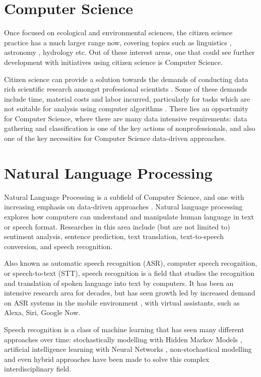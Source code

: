 \section*{Computer Science}

Once focused on ecological and environmental sciences, the citizen science practice has a much larger range now, covering topics such as linguistics \cite{svendsen2018dynamics}, astronomy \cite{marshall2015ideas}, hydrology \cite{buytaert2014citizen} etc. Out of these interest areas, one that could see further development with initiatives using citizen science is Computer Science.

Citizen science can provide a solution towards the demands of conducting data rich scientific research amongst 
professional scientists \cite{greenhill2014playing}. Some of these demands include time, material costs and labor incurred, particularly for tasks which are not suitable for analysis using computer algorithms \cite{silvertown2009new}. There lies an opportunity for Computer Science, where there are many data intensive requirements: data gathering and classification is one of the key actions of nonprofessionals, and also one of the key necessities for Computer Science data-driven approaches.

\section*{Natural Language Processing}

Natural Language Processing is a subfield of Computer Science, and one with increasing emphasis on data-driven approaches \cite{moore2003comparison}. Natural language processing explores how computers can understand and manipulate human language in text or speech format. Researches in this area include (but are not limited to) sentiment analysis, sentence prediction, text translation, text-to-speech conversion, and speech recognition.

Also known as automatic speech recognition (ASR), computer speech recognition, or speech-to-text (STT), speech recognition is a field that studies the recognition and translation of spoken language into text by computers. It has been an intensive research area for decades, but has seen growth led by increased demand on ASR systems in the mobile environment \cite{yu2016automatic}, with virtual assistants, such as Alexa, Siri, Google Now.

Speech recognition is a class of machine learning that has seen many different approaches over time: stochastically modelling with Hidden Markov Models  \cite{gales2008application}, artificial intelligence learning with Neural Networks \cite{graves2013speech}, non-stochastical modelling \cite{burget2003nonrandomattr} and even hybrid approaches \cite{wang2020transformer} have been made to solve this complex interdisciplinary field.

